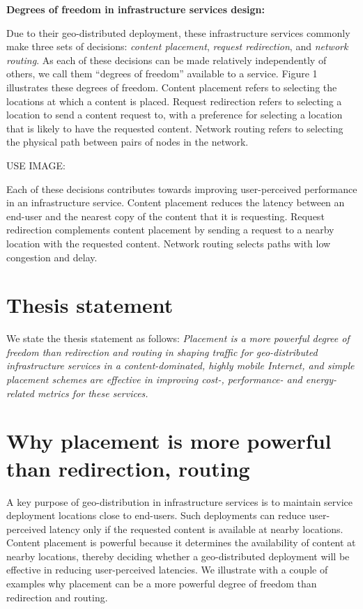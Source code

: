 \textbf{Degrees of freedom in infrastructure services design:}

Due to their geo-distributed deployment, these infrastructure services commonly make three sets of decisions: \emph{content placement}, \emph{request redirection}, and \emph{network routing}. As each of these decisions can be made relatively independently of others, we call them ``degrees of freedom'' available to a service. Figure 1 illustrates these degrees of freedom. Content placement refers to selecting the locations at which a content is placed. Request redirection refers to selecting a location to send a content request to, with a preference for selecting a location that is likely to have the requested content. Network routing refers to selecting the physical path between pairs of nodes in the network.

USE IMAGE:

Each of these decisions contributes towards improving user-perceived performance in an infrastructure service. Content placement reduces the latency between an end-user and the nearest copy of the content that it is requesting. Request redirection complements content placement by sending a request to a nearby location with the requested content. Network routing selects paths with low congestion and delay.

\section{Thesis statement}

We state the thesis statement as follows: \emph{Placement is a more powerful degree of freedom than redirection and routing in shaping traffic for geo-distributed infrastructure services in a content-dominated, highly mobile Internet, and simple placement schemes are effective in improving cost-, performance- and energy-related metrics for these services.}



\section{Why placement is more powerful than redirection, routing}

A key purpose of geo-distribution in infrastructure services is to maintain service deployment locations close to end-users.  Such deployments can reduce user-perceived latency only if the requested content is available at nearby locations. 
Content placement is powerful because it determines the availability of content at nearby locations, thereby deciding whether a geo-distributed deployment will be effective in reducing user-perceived latencies. We illustrate with a couple of examples why placement can be a more powerful degree of freedom than redirection and routing.


